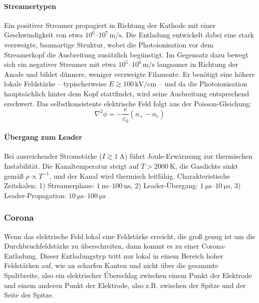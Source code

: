 \paragraph{Streamertypen}
Ein positiver Streamer propagiert in Richtung der Kathode mit einer Geschwindigkeit von etwa $10^{6}\text{–}10^{7}\,\mathrm{m/s}$. Die Entladung entwickelt dabei eine stark verzweigte, baumartige Struktur, wobei die Photoionisation vor dem Streamerkopf die Ausbreitung zusätzlich begünstigt. Im Gegensatz dazu bewegt sich ein negativer Streamer mit etwa $10^{5}\text{–}10^{6}\,\mathrm{m/s}$ langsamer in Richtung der Anode und bildet dünnere, weniger verzweigte Filamente. Er benötigt eine höhere lokale Feldstärke – typischerweise $E \gtrsim 100\,\mathrm{kV/cm}$ – und da die Photoionisation hauptsächlich hinter dem Kopf stattfindet, wird seine Ausbreitung entsprechend erschwert.
Das selbstkonsistente elektrische Feld folgt aus der Poisson-Gleichung:
\begin{equation}
    \nabla^2 \phi = -\frac{e}{\varepsilon_0}(n_+ - n_e)
\end{equation}
\paragraph{Übergang zum Leader}
Bei ausreichender Stromstärke ($I \gtrsim \SI{1}{\ampere}$) führt Joule-Erwärmung zur thermischen Instabilität. Die Kanaltemperatur steigt auf $T > \SI{2000}{\kelvin}$, die Gasdichte sinkt gemäß $\rho \propto T^{-1}$, und der Kanal wird thermisch leitfähig. Charakteristische Zeitskalen: 1) Streamerphase: $\SIrange{1}{100}{\nano\second}$, 2) Leader-Übergang: $\SIrange{1}{10}{\micro\second}$, 3) Leader-Propagation: $\SIrange{10}{100}{\micro\second}$

\subsubsection{Corona}
Wenn das elektrische Feld lokal eine Feldstärke erreicht, die groß genug ist um die Durchbruchfeldstärke zu überschreiten, dann kommt es zu einer Corona-Entladung. Dieser Entladungstyp tritt nur lokal in einem Bereich hoher Feldstärken auf, wie an scharfen Kanten und nicht über die gesammte Spaltbreite, also ein elektrischer Ǔberschlag zwischen einem Punkt der Elektrode und einem anderen Punkt der Elektrode, also z.B. zwischen der Spitze und der Seite der Spitze.
